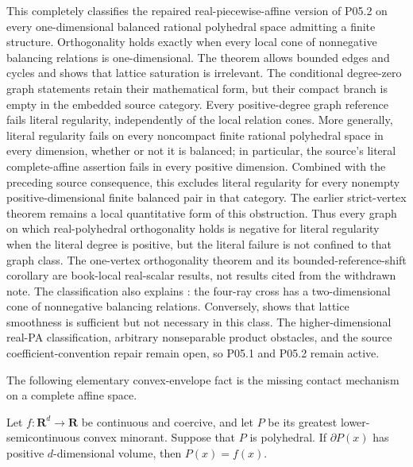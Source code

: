 This completely classifies the repaired real-piecewise-affine version of
P05.2 on every one-dimensional balanced rational polyhedral space admitting
a finite structure.  Orthogonality holds exactly when every local cone of
nonnegative balancing relations is one-dimensional.  The theorem allows
bounded edges and cycles and shows that lattice saturation is irrelevant.
The conditional degree-zero graph statements retain their mathematical
form, but their compact branch is empty in the embedded source category.
Every positive-degree graph reference fails literal regularity,
independently of the local relation cones.  More generally, literal
regularity fails on every noncompact finite rational polyhedral space in
every dimension, whether or not it is balanced; in particular, the
source's literal complete-affine assertion fails in every positive
dimension. Combined with the preceding source consequence, this excludes
literal regularity for every nonempty positive-dimensional finite balanced
pair in that category. The earlier strict-vertex theorem remains a local quantitative
form of this obstruction.  Thus every graph on which real-polyhedral
orthogonality holds is negative for literal regularity when the literal
degree is positive, but the literal failure is not confined to that graph
class.  The
one-vertex orthogonality theorem and its bounded-reference-shift corollary
are book-local real-scalar results, not results cited from the withdrawn
note.  The classification also explains
: the four-ray cross has a
two-dimensional cone of nonnegative balancing relations.  Conversely,
 shows that lattice
smoothness is sufficient but not necessary in this class.  The
higher-dimensional real-PA classification, arbitrary nonseparable product
obstacles, and the source
coefficient-convention repair remain open, so P05.1 and P05.2 remain active.

The following elementary convex-envelope fact is the missing contact
mechanism on a complete affine space.

\begin{lemma}\label{lem:frontier-polyhedral-affine-contact}
Let \(f:\mathbf R^d\to\mathbf R\) be continuous and coercive, and let
\(P\) be its greatest lower-semicontinuous convex minorant.  Suppose that
\(P\) is polyhedral.  If \(\partial P(x)\) has positive
\(d\)-dimensional volume, then \(P(x)=f(x)\).
\end{lemma}

